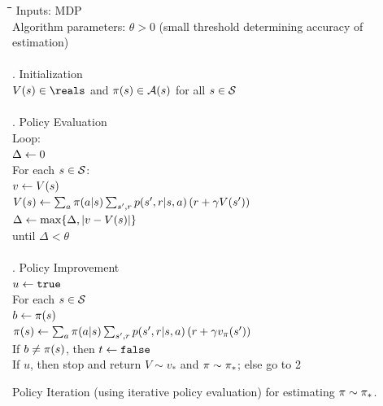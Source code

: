 \begin{table}
\begin{tabbing}
\hspace*{1cm}\=\hspace*{1cm}\=\hspace*{1cm}\=\hspace*{1cm}\=
\hspace*{1cm}\=\hspace*{1cm}\=\hspace*{1cm}\=\hspace*{1cm}\= \kill
\> Inputs: MDP \\
\> Algorithm parameters: $\theta > 0$ (small threshold determining accuracy of estimation)\\
\\
. Initialization \\
\> \> $V(\curs) \in \reals$ and $\pi(s) \in \mathcal{A}(s)$ for all $s\in\mathcal{S}$\\
\\
. Policy Evaluation\\
\> \> Loop: \\
\> \> \> $\Delta \leftarrow 0$ \\
\> \> \> For each $s\in\mathcal{S}$: \\
\> \> \> \> $v\leftarrow V(s)$ \\
\> \> \> \> $V(s) \leftarrow \sum_a \pi(a|s) \sum_{{s'}, r} p({s'}, r|s,a) \left( r + \gamma V({s'}) \right)$ \\
\> \> \> \> $\Delta \leftarrow \max\{\Delta, |v-V(s)|\}$ \\
\> \> until $\Delta < \theta$\\
\\
. Policy Improvement\\
\> \> $u \leftarrow {\tt true}$\\
\> \> For each $s \in \mathcal{S}$\\
\> \> \> $b \leftarrow \pi(s)$\\
\> \> \> $\pi(s) \leftarrow \sum_a \pi(a|s) \sum_{{s'}, r} p({s'}, r|s,a) \left( r + \gamma v_{\pi}({s'}) \right)$\\
\> \> \> If $b \neq \pi(s)$, then $t \leftarrow {\tt false}$\\
\> \> If $u$, then stop and return $V \sim v_\ast$ and $\pi \sim {\ensuremath{\pi}}_\ast$; else go to 2
\end{tabbing}
\caption{Policy Iteration (using iterative policy evaluation) for estimating $\pi \sim {\ensuremath{\pi}}_\ast$.}
\label{tab:eq:policy-iteration}
\end{table}


